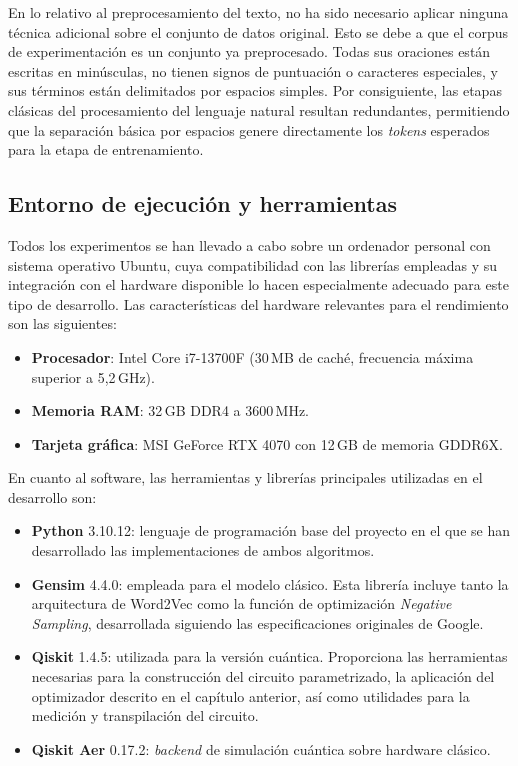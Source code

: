 En lo relativo al preprocesamiento del texto, no ha sido necesario aplicar ninguna técnica adicional sobre el conjunto de datos original. Esto se debe a que el corpus de experimentación es un conjunto ya preprocesado. Todas sus oraciones están escritas en minúsculas, no tienen signos de puntuación o caracteres especiales, y sus términos están delimitados por espacios simples. Por consiguiente, las etapas clásicas del procesamiento del lenguaje natural resultan redundantes, permitiendo que la separación básica por espacios genere directamente los \textit{tokens} esperados para la etapa de entrenamiento.

\subsection{Entorno de ejecución y herramientas}

Todos los experimentos se han llevado a cabo sobre un ordenador personal con sistema operativo Ubuntu, cuya compatibilidad con las librerías empleadas y su integración con el hardware disponible lo hacen especialmente adecuado para este tipo de desarrollo. Las características del hardware relevantes para el rendimiento son las siguientes:

\begin{itemize}
  \item \textbf{Procesador}: Intel Core i7-13700F (30\,MB de caché, frecuencia máxima superior a 5,2\,GHz).
  \item \textbf{Memoria RAM}: 32\,GB DDR4 a 3600\,MHz.
  \item \textbf{Tarjeta gráfica}: MSI GeForce RTX 4070 con 12\,GB de memoria GDDR6X.
\end{itemize}

En cuanto al software, las herramientas y librerías principales utilizadas en el desarrollo son:

\begin{itemize}
  \item \textbf{Python} 3.10.12: lenguaje de programación base del proyecto en el que se han desarrollado las implementaciones de ambos algoritmos.
  \item \textbf{Gensim} 4.4.0: empleada para el modelo clásico. Esta librería incluye tanto la arquitectura de Word2Vec como la función de optimización \textit{Negative Sampling}, desarrollada siguiendo las especificaciones originales de Google.
  \item \textbf{Qiskit} 1.4.5: utilizada para la versión cuántica. Proporciona las herramientas necesarias para la construcción del circuito parametrizado, la aplicación del optimizador descrito en el capítulo anterior, así como utilidades para la medición y transpilación del circuito.
  \item \textbf{Qiskit Aer} 0.17.2: \textit{backend} de simulación cuántica sobre hardware clásico.
\end{itemize}

